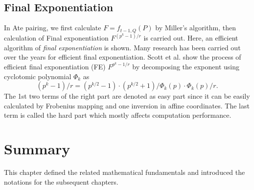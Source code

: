 \subsection{Final Exponentiation}
In Ate pairing, we first calculate $F=f_{t-1,Q}(P)$ by Miller's algorithm, then calculation of Final exponentiation $F^{(p^{k}-1)/r}$ is carried out.
Here, an efficient algorithm of {\it final exponentiation} is shown.
Many research has been carried out over the years for efficient final exponentiation.
Scott et al. \cite{PAIRING:SBCDK09a} show the process of efficient final exponentiation (FE) $F^{p^k-1/r}$ by decomposing the exponent using cyclotomic polynomial $\Phi_{k}$ as 
\begin{equation}\label{scott_dec}
(p^k-1)/r = (p^{k/2}-1) \cdot(p^{k/2}+1)/\Phi_{k}(p)\cdot \Phi_{k}(p)/r.
\end{equation}
The 1st two terms of the right part are denoted as easy part since it can be easily calculated by Frobenius mapping and one inversion in affine coordinates. 
The last term is called the hard part which mostly affects computation performance.

%    
\section{Summary}
This chapter defined the related mathematical fundamentals and introduced the notations for the subsequent chapters.


